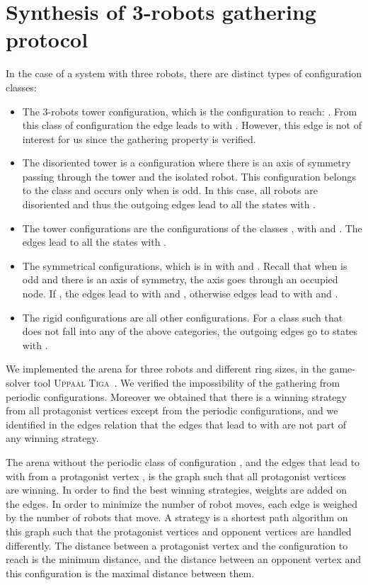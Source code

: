 \documentclass[envcountsame]{llncs} \usepackage[english]{babel}
\begin{document}
\section{Synthesis of 3-robots gathering protocol}
In the case of a system with three robots, there are  distinct types of configuration classes:  
\begin{itemize}
	\item The 3-robots tower configuration, which is the configuration to reach: .
From this class of configuration  
the edge leads to  with . However, this edge is not of interest for us since the gathering property is verified.
	\item The disoriented tower is a configuration where there is an axis of symmetry passing through 
the tower and the isolated robot.
This configuration belongs to the class  and occurs only when  is odd.  
In this case, all robots are disoriented and thus the outgoing edges lead to all the states 
with .
	\item The tower configurations are the configurations of the classes , 
with  and .
The edges lead to all the states  with .
	\item The symmetrical configurations, which is in  with  and .
 Recall that when  is odd and there is an axis of symmetry, the axis goes through an occupied node.
If , the edges lead to  with  and , 
otherwise edges lead to  with  and .
	\item The rigid configurations are all other configurations. For a class  such that 
does not fall into any of the above categories, 
the outgoing edges go to states  with . 
\end{itemize}


We implemented the arena for three robots and different ring sizes, in the game-solver tool \textsc{Uppaal Tiga}~\cite{UPPAAL-TIGA}. 
We verified the impossibility of the gathering from periodic configurations.
Moreover we obtained that there is a winning strategy from all protagonist vertices except from the periodic configurations, 
and we identified in the edges relation that the edges that lead to  with  are not part of any winning strategy.

The arena without the periodic class of configuration , and the edges that lead to 
 with  from a protagonist vertex , is the graph such that all protagonist vertices are winning. 
In order to find the best winning strategies, weights are added on the edges. 
In order to minimize the number of robot moves, each edge is weighed by the number of robots that move.
A strategy is  a shortest path algorithm on this graph such that the protagonist vertices and opponent vertices
are handled differently.
The distance between a protagonist vertex and the configuration to reach is the minimum distance, and the distance between 
an opponent vertex and this configuration is the maximal distance between them.
\end{document}
